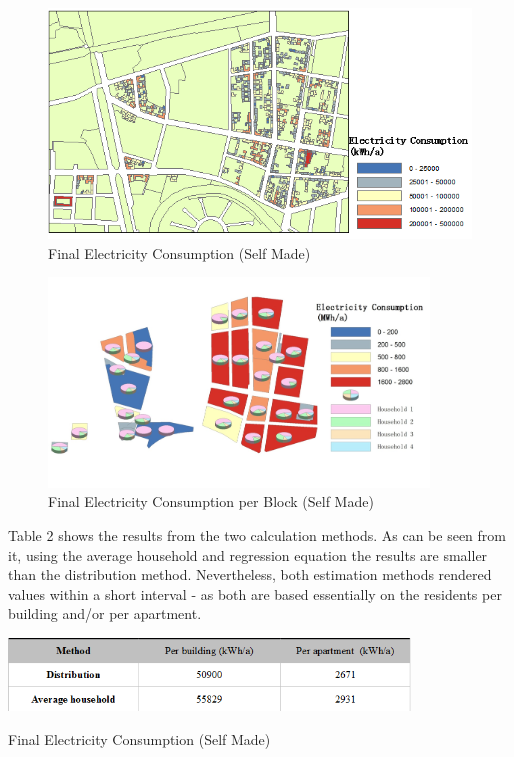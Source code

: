 \documentclass[11pt]{article}
\begin{document}
\begin{figure}[H]
	\centering
	\includegraphics[width=1\textwidth]{fig17.png}
	\caption{Final Electricity Consumption (Self Made)}
	\label{fig:figure17}
\end{figure}
\begin{figure}[H]
	\centering
	\includegraphics[width=0.9\textwidth]{fig19.png}
	\caption{Final Electricity Consumption per Block (Self Made)}
	\label{fig:figure19}
\end{figure}
Table 2 shows the results from the two calculation methods. As can be seen from it, using the average household and regression equation the results are smaller than the distribution method. Nevertheless, both estimation methods rendered values within a short interval - as both are based essentially on the residents per building and/or per apartment. 


\begin{table}[H]
	\centering
	\includegraphics[width=0.8\textwidth]{fig18.png}
	\caption{Final Electricity Consumption (Self Made)}
	\label{fig:figure18}
\end{table}
\end{document}
